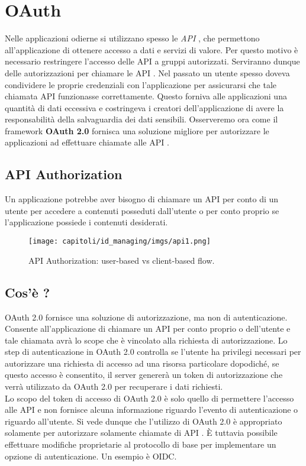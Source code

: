 \newcommand{\api}{API \emoji{bee}}

\chapter{OAuth}

Nelle applicazioni odierne si utilizzano spesso le \textit{API} , che permettono
all'applicazione di ottenere accesso a dati e servizi di valore. Per questo motivo
è necessario restringere l'accesso delle \api{} a gruppi autorizzati. Serviranno dunque
delle autorizzazioni per chiamare le \api{}. Nel passato un utente spesso doveva condividere
le proprie credenziali con l'applicazione per assicurarsi che tale chiamata \api{}
funzionasse correttamente. Questo forniva alle applicazioni una quantità di dati
eccessiva e costringeva i creatori dell'applicazione di avere la responsabilità
della salvaguardia dei dati sensibili. Osserveremo ora come il framework
\textbf{OAuth 2.0} fornisca una soluzione migliore per autorizzare le applicazioni
ad effettuare chiamate alle \api{}.

\section{API Authorization}

Un applicazione potrebbe aver bisogno di chiamare un \api{} per conto di un utente
per accedere a contenuti posseduti dall'utente o per conto proprio se l'applicazione
possiede i contenuti desiderati.

\begin{figure}[H]
      \centering
      \texttt{[image: capitoli/id\_managing/imgs/api1.png]}
      \caption{\api{} Authorization: user-based vs client-based flow.}
\end{figure}

\section{Cos'è ?}

OAuth 2.0 fornisce una soluzione di autorizzazione, ma non di autenticazione. Consente
all'applicazione di chiamare un \api{} per conto proprio o dell'utente e tale chiamata
avrà lo scope che è vincolato alla richiesta di autorizzazione. Lo step di
autenticazione in OAuth 2.0 controlla se l'utente ha privilegi necessari per
autorizzare una richiesta di accesso ad una risorsa particolare dopodiché, se
questo accesso è consentito, il server genererà un token di autorizzazione che
verrà utilizzato da OAuth 2.0 per recuperare i dati richiesti.\\
Lo scopo del token di accesso di OAuth 2.0 è solo quello di permettere l'accesso alle
\api{} e non fornisce alcuna informazione riguardo l'evento di autenticazione o riguardo
all'utente.
Si vede dunque che l'utilizzo di OAuth 2.0 è appropriato solamente per autorizzare
solamente chiamate di \api{}. È tuttavia possibile effettuare modifiche proprietarie al
protocollo di base per implementare un opzione di autenticazione. Un esempio è
OIDC.

